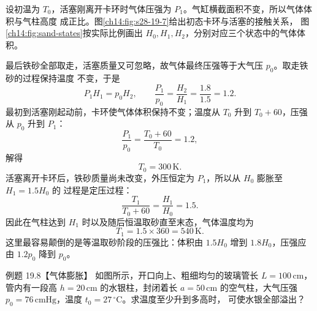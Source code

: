 \begin{xesolution}
设初温为 $T_0$，活塞刚离开卡环时气体压强为 $P_1$。气缸横截面积不变，所以气体体积与气柱高度
成正比。图\ref{ch14:fig:s28-19-7}给出初态卡环与活塞的接触关系，
图\ref{ch14:fig:sand-states}按实际比例画出 $H_0,H_1,H_2$，分别对应三个状态中的气体体积。

\sandPistonDiagram

最后铁砂全部取走，活塞质量又可忽略，故气体最终压强等于大气压 $p_0$。取走铁砂的过程保持温度
不变，于是
\begin{equation}
  P_1H_1=p_0H_2,\qquad
  \frac{P_1}{p_0}=\frac{H_2}{H_1}=\frac{1.8}{1.5}=1.2.
\end{equation}
最初到活塞刚起动前，卡环使气体体积保持不变；温度从 $T_0$ 升到 $T_0+60$，压强从 $p_0$ 升到
$P_1$：
\begin{equation}
  \frac{P_1}{p_0}=\frac{T_0+60}{T_0}=1.2,
\end{equation}
解得
\begin{equation}
  \boxed{T_0=300\,\mathrm K}.
\end{equation}
活塞离开卡环后，铁砂质量尚未改变，外压恒定为 $P_1$，所以从 $H_0$ 膨胀至 $H_1=1.5H_0$ 的
过程是定压过程：
\begin{equation}
  \frac{T_1}{T_0+60}=\frac{H_1}{H_0}=1.5.
\end{equation}
因此在气柱达到 $H_1$ 时以及随后恒温取砂直至末态，气体温度均为
\begin{equation}
  \boxed{T_1=1.5\times360=540\,\mathrm K}.
\end{equation}
这里最容易颠倒的是等温取砂阶段的压强比：体积由 $1.5H_0$ 增到 $1.8H_0$，压强应由 $1.2p_0$
降到 $p_0$。
\end{xesolution}

\begin{origexamplebox}{例题 19.8【气体膨胀】}
如图所示，开口向上、粗细均匀的玻璃管长 $L=100\,\mathrm{cm}$，管内有一段高
$h=20\,\mathrm{cm}$ 的水银柱，封闭着长 $a=50\,\mathrm{cm}$ 的空气柱，大气压强
$p_0=76\,\mathrm{cmHg}$，温度 $t_0=27\,{}^\circ\mathrm C$。求温度至少升到多高时，
可使水银全部溢出？
\figureNineteenEightFaithful
\end{origexamplebox}

